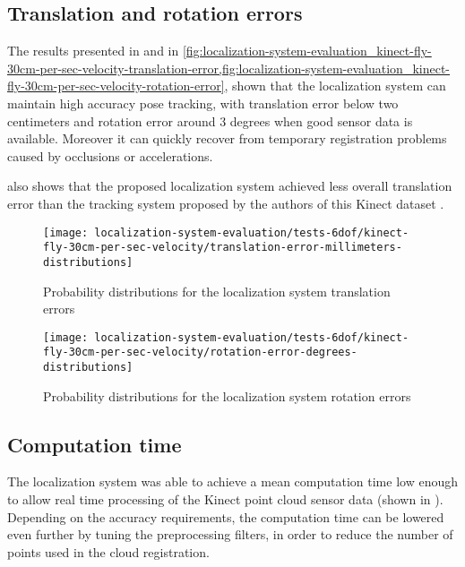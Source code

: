 \subsection{Translation and rotation errors}

The results presented in  and in \cref{fig:localization-system-evaluation_kinect-fly-30cm-per-sec-velocity-translation-error,fig:localization-system-evaluation_kinect-fly-30cm-per-sec-velocity-rotation-error}, shown that the localization system can maintain high accuracy pose tracking, with translation error below two centimeters and rotation error around 3 degrees when good sensor data is available. Moreover it can quickly recover from temporary registration problems caused by occlusions or accelerations.

 also shows that the proposed localization system achieved less overall translation error than the tracking system proposed by the authors of this Kinect dataset \cite{Pomerleau2011}.


\begin{figure}[H]
	\centering
	\begin{minipage}[H]{0.45\textwidth}
		\centering
		\texttt{[image: localization-system-evaluation/tests-6dof/kinect-fly-30cm-per-sec-velocity/translation-error-millimeters-distributions]}
		\caption{Probability distributions for the localization system translation errors}
		\label{fig:localization-system-evaluation_kinect-fly-30cm-per-sec-velocity-translation-error}
	\end{minipage}\hfill
	\begin{minipage}[H]{0.45\textwidth}
		\centering
		\texttt{[image: localization-system-evaluation/tests-6dof/kinect-fly-30cm-per-sec-velocity/rotation-error-degrees-distributions]}
		\caption{Probability distributions for the localization system rotation errors}
		\label{fig:localization-system-evaluation_kinect-fly-30cm-per-sec-velocity-rotation-error}
	\end{minipage}
\end{figure}


\subsection{Computation time}

The localization system was able to achieve a mean computation time low enough to allow real time processing of the Kinect point cloud sensor data (shown in ). Depending on the accuracy requirements, the computation time can be lowered even further by tuning the preprocessing filters, in order to reduce the number of points used in the cloud registration.

